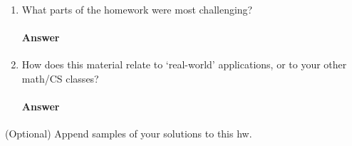 \documentclass{article}
\begin{document}
\begin{enumerate}
    \item What parts of the homework were most challenging?

        \paragraph{Answer}

    \item How does this material relate to `real-world' applications, or to your
        other math/CS classes?

        \paragraph{Answer}
\end{enumerate}

(Optional)
Append samples of your solutions to this hw.
\end{document}
